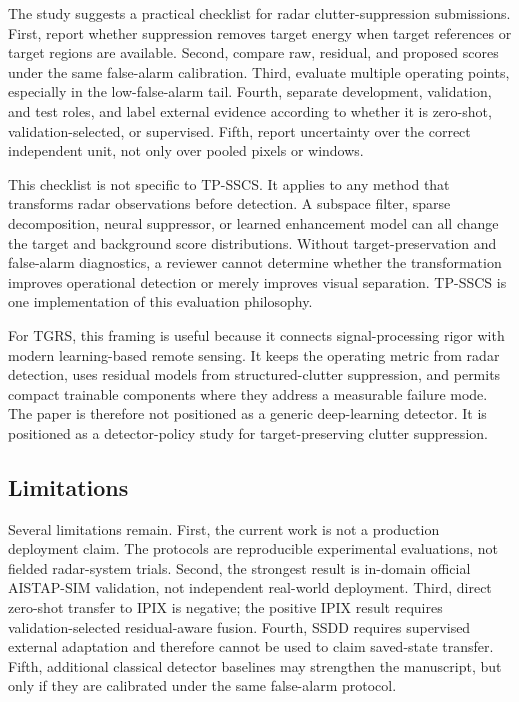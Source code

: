 \documentclass[journal]{IEEEtran}
\begin{document}
The study suggests a practical checklist for radar clutter-suppression submissions. First, report whether suppression removes target energy when target references or target regions are available. Second, compare raw, residual, and proposed scores under the same false-alarm calibration. Third, evaluate multiple operating points, especially in the low-false-alarm tail. Fourth, separate development, validation, and test roles, and label external evidence according to whether it is zero-shot, validation-selected, or supervised. Fifth, report uncertainty over the correct independent unit, not only over pooled pixels or windows.

This checklist is not specific to TP-SSCS. It applies to any method that transforms radar observations before detection. A subspace filter, sparse decomposition, neural suppressor, or learned enhancement model can all change the target and background score distributions. Without target-preservation and false-alarm diagnostics, a reviewer cannot determine whether the transformation improves operational detection or merely improves visual separation. TP-SSCS is one implementation of this evaluation philosophy.

For TGRS, this framing is useful because it connects signal-processing rigor with modern learning-based remote sensing. It keeps the operating metric from radar detection, uses residual models from structured-clutter suppression, and permits compact trainable components where they address a measurable failure mode. The paper is therefore not positioned as a generic deep-learning detector. It is positioned as a detector-policy study for target-preserving clutter suppression.

\subsection{Limitations}

Several limitations remain. First, the current work is not a production deployment claim. The protocols are reproducible experimental evaluations, not fielded radar-system trials. Second, the strongest result is in-domain official AISTAP-SIM validation, not independent real-world deployment. Third, direct zero-shot transfer to IPIX is negative; the positive IPIX result requires validation-selected residual-aware fusion. Fourth, SSDD requires supervised external adaptation and therefore cannot be used to claim saved-state transfer. Fifth, additional classical detector baselines may strengthen the manuscript, but only if they are calibrated under the same false-alarm protocol.
\end{document}
